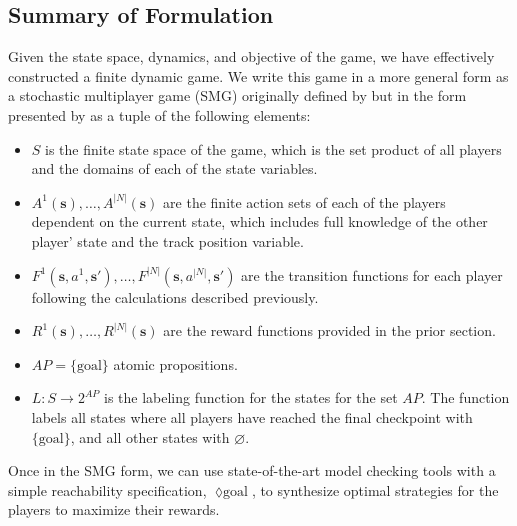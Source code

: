\subsection{Summary of Formulation}
Given the state space, dynamics, and objective of the game, we have effectively constructed a finite dynamic game. We write this game in a more general form as a stochastic multiplayer game (SMG) originally defined by \citet{Shapley1953} but in the form presented by \citet{Chen2013} as a tuple of the following elements:


\begin{itemize}
    \item $S$ is the finite state space of the game, which is the set product of all players and the domains of each of the state variables.
    \item $A^1(\boldsymbol{s}), \ldots, A^{|N|}(\boldsymbol{s})$ are the finite action sets of each of the players dependent on the current state, which includes full knowledge of the other player' state and the track position variable.
    \item $F^1(\boldsymbol{s}, a^1, \boldsymbol{s}'), \ldots, F^{|N|}(\boldsymbol{s}, a^{|N|}, \boldsymbol{s}')$ are the transition functions for each player following the calculations described previously.
    \item $R^1(\boldsymbol{s}),\ldots,R^{|N|}(\boldsymbol{s})$ are the reward functions provided in the prior section.
     \item $AP = \{\text{goal}\}$ atomic propositions.
    \item $L: S \rightarrow 2^{AP}$ is the labeling function for the states for the set $AP$. The function labels all states where all players have reached the final checkpoint with $\{\text{goal}\}$, and all other states with $\varnothing$.
\end{itemize}

Once in the SMG form, we can use state-of-the-art model checking tools with a simple reachability specification, $\lozenge \text{goal}$, to synthesize optimal strategies for the players to maximize their rewards. 

